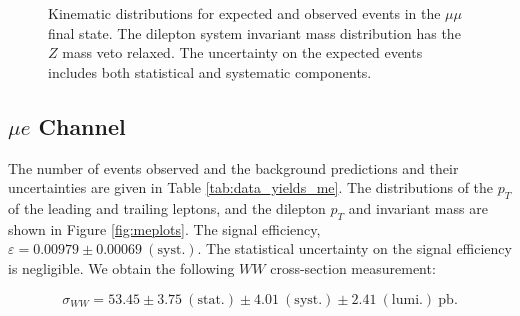 \begin{figure}[!hbtp]
\begin{center}
\caption{Kinematic distributions for expected and observed events in the $\mu\mu$ final state.
The dilepton system invariant mass distribution has the $Z$ mass veto relaxed.
The uncertainty on the expected events includes both statistical and systematic components.}
\label{fig:mmplots}
\end{center}
\end{figure}

%
%
%
\clearpage
\subsection{$\mu e$ Channel}

The number of events observed and the background predictions and their uncertainties are
given in Table \ref{tab:data_yields_me}.
The distributions of the $p_{T}$ of the leading and trailing leptons, and the dilepton $p_{T}$
and invariant mass are shown in Figure \ref{fig:meplots}.
The signal efficiency,  $\varepsilon = 0.00979 \pm 0.00069~\mathrm{(syst.)}$.
The statistical uncertainty on the signal efficiency is negligible.
We obtain the following $WW$ cross-section measurement:

\begin{equation*}
\sigma_{WW}  = 53.45 \pm 3.75~\mathrm{(stat.)} \pm 4.01~\mathrm{(syst.)} \pm 2.41~\mathrm{(lumi.)~pb}. 
\end{equation*}

